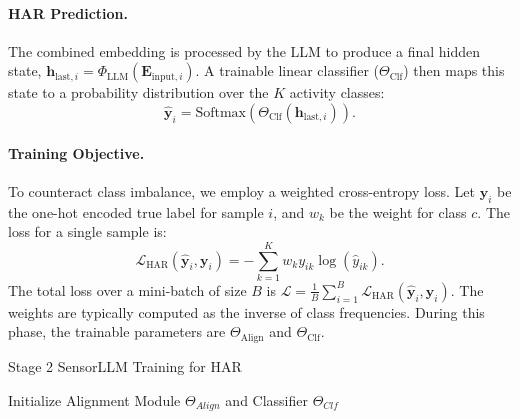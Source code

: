 \paragraph{HAR Prediction.} The combined embedding is processed by the LLM to produce a final hidden state, $\mathbf{h}_{\text{last}, i} = \Phi_{\text{LLM}}(\mathbf{E}_{\text{input}, i})$. A trainable linear classifier ($\Theta_{\text{Clf}}$) then maps this state to a probability distribution over the $K$ activity classes:
\[
\hat{\mathbf{y}}_i = \text{Softmax}(\Theta_{\text{Clf}}(\mathbf{h}_{\text{last}, i})).
\]

\paragraph{Training Objective.} To counteract class imbalance, we employ a weighted cross-entropy loss. Let $\mathbf{y}_i$ be the one-hot encoded true label for sample $i$, and $w_k$ be the weight for class $c$. The loss for a single sample is:
\[
\mathcal{L}_{\text{HAR}}(\hat{\mathbf{y}}_i, \mathbf{y}_i) = - \sum_{k=1}^{K} w_k y_{ik} \log(\hat{y}_{ik}).
\]
The total loss over a mini-batch of size $B$ is $\mathcal{L} = \frac{1}{B}\sum_{i=1}^{B} \mathcal{L}_{\text{HAR}}(\hat{\mathbf{y}}_i, \mathbf{y}_i)$. The weights are typically computed as the inverse of class frequencies. During this phase, the trainable parameters are $\Theta_{\text{Align}}$ and $\Theta_{\text{Clf}}$.

\begin{algorithm}[t]
\caption{Stage 2 SensorLLM Training for HAR}

Initialize Alignment Module $\Theta_{Align}$ and Classifier $\Theta_{Clf}$\;
\;
\end{algorithm}


